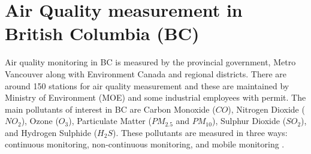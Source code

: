  





 \section{Air Quality measurement in British Columbia (BC)}

 Air quality monitoring in BC is measured by the provincial government, Metro Vancouver along with Environment Canada and regional districts. There are around 150 stations for air quality measurement and these are maintained by Ministry of Environment (MOE) and some industrial employees with permit. The main pollutants of interest in BC are Carbon Monoxide ($CO$), Nitrogen Dioxide ($NO_{2}$), Ozone ($O_{3}$), Particulate Matter ($PM_{2.5}$ and $PM_{10}$), Sulphur Dioxide ($SO_{2}$), and Hydrogen Sulphide ($H_{2}S$). These pollutants are measured in three ways: continuous monitoring, non-continuous monitoring, and mobile monitoring \cite{bc}.
 
